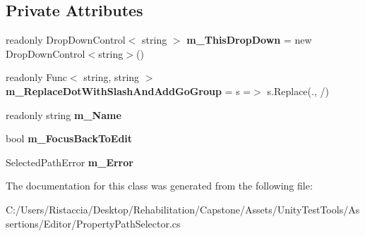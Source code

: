 \subsection*{Private Attributes}
\begin{DoxyCompactItemize}
\item 
\mbox{\label{class_unity_test_1_1_property_path_selector_a0e958be4ecaca522822bff0e46d62bd4}} 
readonly Drop\+Down\+Control$<$ string $>$ {\bfseries m\+\_\+\+This\+Drop\+Down} = new Drop\+Down\+Control$<$string$>$()
\item 
\mbox{\label{class_unity_test_1_1_property_path_selector_afe8dd1ce8d4bf5c1ca6dcb3a47266673}} 
readonly Func$<$ string, string $>$ {\bfseries m\+\_\+\+Replace\+Dot\+With\+Slash\+And\+Add\+Go\+Group} = s =$>$ s.\+Replace(\textquotesingle{}.\textquotesingle{}, \textquotesingle{}/\textquotesingle{})
\item 
\mbox{\label{class_unity_test_1_1_property_path_selector_ae91d2c6f3a1ec6c40a877b2ab988c90d}} 
readonly string {\bfseries m\+\_\+\+Name}
\item 
\mbox{\label{class_unity_test_1_1_property_path_selector_adb68f42d8f5a17d304b3d3309df9d810}} 
bool {\bfseries m\+\_\+\+Focus\+Back\+To\+Edit}
\item 
\mbox{\label{class_unity_test_1_1_property_path_selector_a30dd291bc3ec3f6fac773a758fa1a065}} 
Selected\+Path\+Error {\bfseries m\+\_\+\+Error}
\end{DoxyCompactItemize}


The documentation for this class was generated from the following file\+:\begin{DoxyCompactItemize}
\item 
C\+:/\+Users/\+Ristaccia/\+Desktop/\+Rehabilitation/\+Capstone/\+Assets/\+Unity\+Test\+Tools/\+Assertions/\+Editor/Property\+Path\+Selector.\+cs\end{DoxyCompactItemize}
